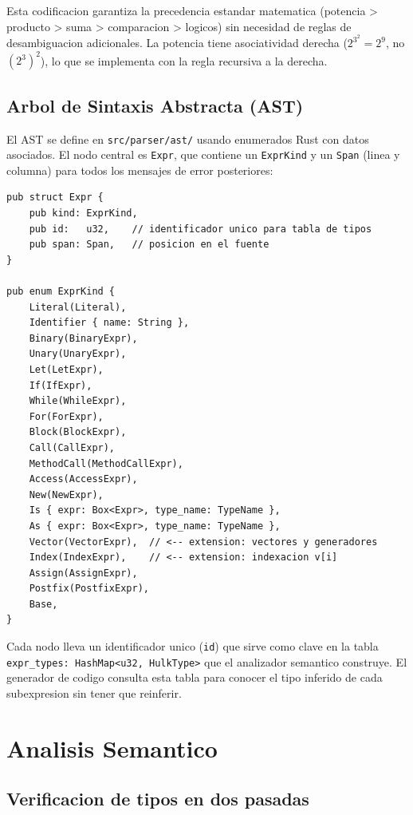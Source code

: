 \documentclass[12pt,a4paper]{article}
\begin{document}
Esta codificacion garantiza la precedencia estandar matematica (potencia > producto >
suma > comparacion > logicos) sin necesidad de reglas de desambiguacion adicionales.
La potencia tiene asociatividad derecha ($2^{3^2} = 2^9$, no $(2^3)^2$), lo que se
implementa con la regla recursiva a la derecha.

\subsection{Arbol de Sintaxis Abstracta (AST)}

El AST se define en \texttt{src/parser/ast/} usando enumerados Rust con datos
asociados. El nodo central es \texttt{Expr}, que contiene un \texttt{ExprKind} y
un \texttt{Span} (linea y columna) para todos los mensajes de error posteriores:

\begin{lstlisting}[style=rust, caption={Estructura principal del AST}]
pub struct Expr {
    pub kind: ExprKind,
    pub id:   u32,    // identificador unico para tabla de tipos
    pub span: Span,   // posicion en el fuente
}

pub enum ExprKind {
    Literal(Literal),
    Identifier { name: String },
    Binary(BinaryExpr),
    Unary(UnaryExpr),
    Let(LetExpr),
    If(IfExpr),
    While(WhileExpr),
    For(ForExpr),
    Block(BlockExpr),
    Call(CallExpr),
    MethodCall(MethodCallExpr),
    Access(AccessExpr),
    New(NewExpr),
    Is { expr: Box<Expr>, type_name: TypeName },
    As { expr: Box<Expr>, type_name: TypeName },
    Vector(VectorExpr),  // <-- extension: vectores y generadores
    Index(IndexExpr),    // <-- extension: indexacion v[i]
    Assign(AssignExpr),
    Postfix(PostfixExpr),
    Base,
}
\end{lstlisting}

Cada nodo lleva un identificador unico (\texttt{id}) que sirve como clave en la tabla
\texttt{expr\_types: HashMap<u32, HulkType>} que el analizador semantico construye.
El generador de codigo consulta esta tabla para conocer el tipo inferido de cada
subexpresion sin tener que reinferir.

\section{Analisis Semantico}

\subsection{Verificacion de tipos en dos pasadas}
\end{document}
